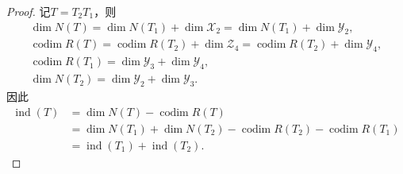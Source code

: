 \documentclass[../../main.tex]{subfiles}%
\begin{document}
\begin{proof}
记$T=T_2T_1$，则
\begin{gather*}
\dim N(T)=\dim N(T_1)+\dim\mathscr{X}_2=\dim N(T_1)+\dim\mathscr{Y}_2,\\
\operatorname{codim}R(T)=\operatorname{codim}R(T_2)+\dim\mathscr{Z}_4=\operatorname{codim}R(T_2)+\dim\mathscr{Y}_4,\\
\operatorname{codim}R(T_1)=\dim\mathscr{Y}_3+\dim\mathscr{Y}_4,\\
\dim N(T_2)=\dim\mathscr{Y}_2+\dim\mathscr{Y}_3.
\end{gather*}
因此
\begin{align*}
\operatorname{ind}(T)&=\dim N(T)-\operatorname{codim}R(T)\\
&=\dim N(T_1)+\dim N(T_2)-\operatorname{codim}R(T_2)-\operatorname{codim}R(T_1)\\
&=\operatorname{ind}(T_1)+\operatorname{ind}(T_2).
\end{align*}
\end{proof}
\end{document}
